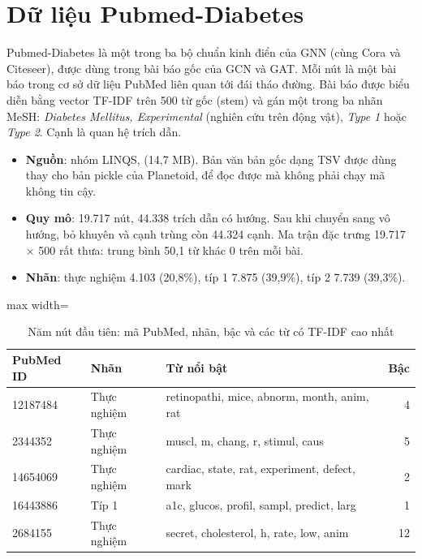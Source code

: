 \section{Dữ liệu Pubmed-Diabetes}

Pubmed-Diabetes \cite{namata2012,sen2008} là một trong ba bộ chuẩn kinh điển của GNN (cùng Cora và Citeseer), được dùng trong bài báo gốc của GCN và GAT. Mỗi nút là một bài báo trong cơ sở dữ liệu PubMed liên quan tới đái tháo đường. Bài báo được biểu diễn bằng vector TF-IDF trên 500 từ gốc (stem) và gán một trong ba nhãn MeSH: \emph{Diabetes Mellitus, Experimental} (nghiên cứu trên động vật), \emph{Type 1} hoặc \emph{Type 2}. Cạnh là quan hệ trích dẫn.

\begin{itemize}
  \item \textbf{Nguồn}: nhóm LINQS,  (14,7 MB). Bản văn bản gốc dạng TSV được dùng thay cho bản pickle của Planetoid, để đọc được mà không phải chạy mã không tin cậy.
  \item \textbf{Quy mô}: 19.717 nút, 44.338 trích dẫn có hướng. Sau khi chuyển sang vô hướng, bỏ khuyên và cạnh trùng còn 44.324 cạnh. Ma trận đặc trưng 19.717 × 500 rất thưa: trung bình 50,1 từ khác 0 trên mỗi bài.
  \item \textbf{Nhãn}: thực nghiệm 4.103 (20,8\%), típ 1 7.875 (39,9\%), típ 2 7.739 (39,3\%).
\end{itemize}

\begin{table}[H]
\centering
\caption{Năm nút đầu tiên: mã PubMed, nhãn, bậc và các từ có TF-IDF cao nhất}
\label{tab:pubmed-head}
\small
\begin{adjustbox}{max width=\linewidth}
\begin{tabular}{@{}lllr@{}}
\toprule
\textbf{PubMed ID} & \textbf{Nhãn} & \textbf{Từ nổi bật} & \textbf{Bậc} \\
\midrule
12187484 & Thực nghiệm & retinopathi, mice, abnorm, month, anim, rat & 4 \\
2344352 & Thực nghiệm & muscl, m, chang, r, stimul, caus & 5 \\
14654069 & Thực nghiệm & cardiac, state, rat, experiment, defect, mark & 2 \\
16443886 & Típ 1 & a1c, glucos, profil, sampl, predict, larg & 1 \\
2684155 & Thực nghiệm & secret, cholesterol, h, rate, low, anim & 12 \\
\bottomrule
\end{tabular}
\end{adjustbox}
\end{table}

